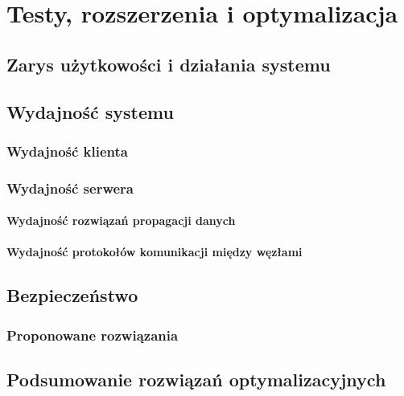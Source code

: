 \chapter{Testy, rozszerzenia i optymalizacja}
\label{cha:testyIOptymalizacje}

\section{Zarys użytkowości i działania systemu}
\label{sec:UX}

\section{Wydajność systemu}
\label{sec:wydajnosc}

\subsection{Wydajność klienta}
\label{sec:wydajnoscKlient}

\subsection{Wydajność serwera}
\label{sec:wydajnoscNode}

\subsubsection{Wydajność rozwiązań propagacji danych}
\subsubsection{Wydajność protokołów komunikacji między węzłami}

\section{Bezpieczeństwo}

\subsection{Proponowane rozwiązania}

\section{Podsumowanie rozwiązań optymalizacyjnych}
\label{sec:optSummary}

